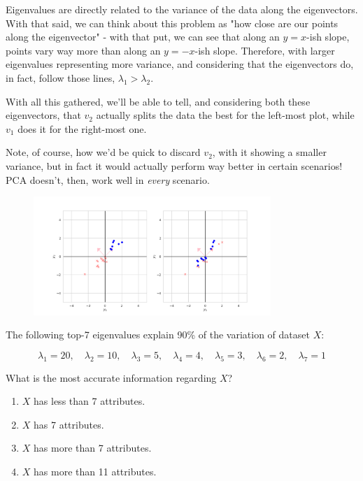 \documentclass[12pt]{article}
\begin{document}
\begin{enumerate}[leftmargin=\labelsep]
  Eigenvalues are directly related to the variance of the data along the eigenvectors.
  With that said, we can think about this problem as "how close are our points along
  the eigenvector" - with that put, we can see that along an $y=x$-ish slope, points
  vary way more than along an $y=-x$-ish slope. Therefore, with larger
  eigenvalues representing more variance, and considering that the eigenvectors
  do, in fact, follow those lines, $\lambda_1 > \lambda_2$.

  With all this gathered, we'll be able to tell, and considering both
  these eigenvectors, that $v_2$ actually splits the data the best for the
  left-most plot, while $v_1$ does it for the right-most one.

  Note, of course, how we'd be quick to discard $v_2$, with it showing
  a smaller variance, but in fact it would actually perform way better in
  certain scenarios! PCA doesn't, then, work well in \textit{every} scenario.

  \begin{figure}[H]
    \centering
    \includegraphics[width=0.8\textwidth]{assets/ex-2/scaled-samples.png}
    \label{fig:samples-2-scaled}
  \end{figure}

  \begin{tcolorbox}[enhanced jigsaw,halign=center,colback=bg,boxrule=0pt,arc=1pt]
    \item The following top-7 eigenvalues explain 90\% of the variation of dataset $X$:

    \begin{equation*}
      \lambda_1 = 20, \quad \lambda_2 = 10, \quad \lambda_3 = 5, \quad \lambda_4 = 4, \quad \lambda_5 = 3, \quad \lambda_6 = 2, \quad \lambda_7 = 1
    \end{equation*}

    What is the most accurate information regarding $X$?

    \begin{enumerate}
      \item $X$ has less than 7 attributes.
      \item $X$ has 7 attributes.
      \item $X$ has more than 7 attributes.
      \item $X$ has more than 11 attributes.
    \end{enumerate}
  \end{tcolorbox}


\end{enumerate}
\end{document}
